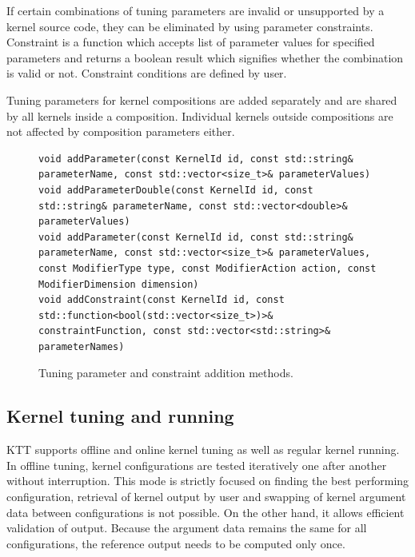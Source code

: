 \documentclass
[
    digital, %
    oneside, %
    table, %
    nolof, %
    nolot, %
    nocover %
]{fithesis3}
\begin{document}
If certain combinations of tuning parameters are invalid or unsupported by a kernel source code, they can be eliminated by using parameter constraints.
Constraint is a function which accepts list of parameter values for specified parameters and returns a boolean result which signifies whether the
combination is valid or not. Constraint conditions are defined by user.

Tuning parameters for kernel compositions are added separately and are shared by all kernels inside a composition. Individual kernels outside compositions
are not affected by composition parameters either.

\begin{figure}
\begin{adjustwidth}{-1cm}{-1cm}
\begin{lstlisting}
void addParameter(const KernelId id, const std::string& parameterName, const std::vector<size_t>& parameterValues)
void addParameterDouble(const KernelId id, const std::string& parameterName, const std::vector<double>& parameterValues)
void addParameter(const KernelId id, const std::string& parameterName, const std::vector<size_t>& parameterValues, const ModifierType type, const ModifierAction action, const ModifierDimension dimension)
void addConstraint(const KernelId id, const std::function<bool(std::vector<size_t>)>& constraintFunction, const std::vector<std::string>& parameterNames)
\end{lstlisting}
\caption{Tuning parameter and constraint addition methods.}
\label{ktt-parameter-methods}
\end{adjustwidth}
\end{figure}

\subsection{Kernel tuning and running}
KTT supports offline and online kernel tuning as well as regular kernel running. In offline tuning, kernel configurations are tested iteratively one
after another without interruption. This mode is strictly focused on finding the best performing configuration, retrieval of kernel output by user and
swapping of kernel argument data between configurations is not possible. On the other hand, it allows efficient validation of output. Because the
argument data remains the same for all configurations, the reference output needs to be computed only once.
\end{document}
